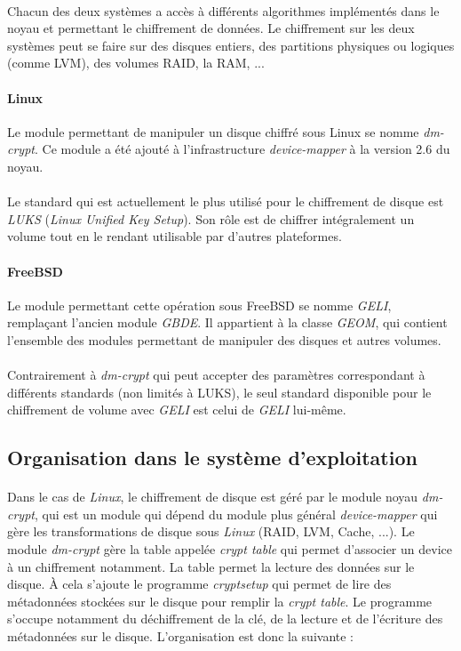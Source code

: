 \paragraph{}
Chacun des deux systèmes a accès à différents algorithmes implémentés dans le
noyau et permettant le chiffrement de données. Le chiffrement sur
les deux systèmes peut se faire sur des disques entiers, des partitions
physiques ou logiques (comme LVM), des volumes RAID, la RAM, ...
\paragraph{Linux}
Le module permettant de manipuler un disque chiffré sous Linux se nomme
\textit{dm-crypt}. Ce module a été ajouté à l'infrastructure
\textit{device-mapper} à la version 2.6 du noyau.\\
\\
Le standard qui est actuellement le plus utilisé pour le chiffrement de disque
est \textit{LUKS} (\textit{Linux Unified Key Setup}\cite{onDiskFormatLuks}). Son
rôle est de chiffrer intégralement un volume tout en le rendant utilisable par
d'autres plateformes.
\paragraph{FreeBSD}
Le module permettant cette opération sous FreeBSD se nomme \textit{GELI},
remplaçant l'ancien module \textit{GBDE}. Il appartient à la classe
\textit{GEOM}, qui contient l'ensemble des modules permettant de manipuler des
disques et autres volumes.\\
\\
Contrairement à \textit{dm-crypt} qui peut accepter des paramètres correspondant
à différents standards (non limités à LUKS), le seul standard disponible pour
le chiffrement de volume avec \textit{GELI} est celui de \textit{GELI} lui-même.

\subsection{Organisation dans le système d'exploitation}
\paragraph{}
Dans le cas de {\em Linux}, le chiffrement de disque est géré par le module 
noyau {\em dm-crypt}, qui est un module qui dépend du module plus général
{\em device-mapper} qui gère les transformations de disque sous {\em Linux} 
(RAID, LVM, Cache, ...).
Le module {\em dm-crypt} gère la table appelée {\em crypt table}
qui permet d'associer un device à un chiffrement notamment. La table permet
la lecture des données sur le disque. À cela s'ajoute le programme 
{\em cryptsetup} qui permet de lire des métadonnées stockées sur le disque 
pour remplir la {\em crypt table}.
Le programme s'occupe notamment du déchiffrement de la clé, de 
la lecture et de l'écriture des métadonnées sur le disque. L'organisation est 
donc la suivante :

